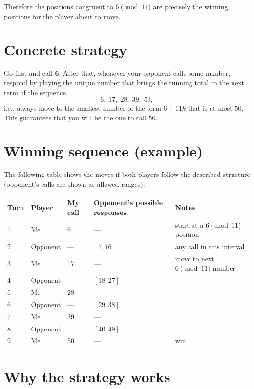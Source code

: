 \documentclass[11pt]{article}
\begin{document}
Therefore the positions congruent to $6\pmod{11}$ are precisely the winning positions for the player about to move.

\section*{Concrete strategy}

\begin{tcolorbox}[resultbox, title=Optimal strategy]
Go first and call \(\mathbf{6}\). After that, whenever your opponent calls some number, respond by playing the unique number that brings the running total to the next term of the sequence
\[
6,\;17,\;28,\;39,\;50,
\]
i.e., always move to the smallest number of the form \(6+11k\) that is at most \(50\). This guarantees that you will be the one to call \(50\).
\end{tcolorbox}

\section*{Winning sequence (example)}

The following table shows the moves if both players follow the described structure (opponent's calls are shown as allowed ranges):

\begin{center}
\renewcommand{\arraystretch}{1.15}
\begin{tabular}{@{}lllll@{}}
\toprule
Turn & Player & My call & Opponent's possible responses & Notes \\
\midrule
1 & Me       & 6  & ---          & start at a \(6\pmod{11}\) position \\
2 & Opponent & ---& $[7,16]$    & any call in this interval \\
3 & Me       & 17 & ---          & move to next \(6\pmod{11}\) number \\
4 & Opponent & ---& $[18,27]$   & \\
5 & Me       & 28 & ---          & \\
6 & Opponent & ---& $[29,38]$   & \\
7 & Me       & 39 & ---          & \\
8 & Opponent & ---& $[40,49]$   & \\
9 & Me       & 50 & ---          & win \\
\bottomrule
\end{tabular}
\end{center}

\section*{Why the strategy works}
\end{document}
